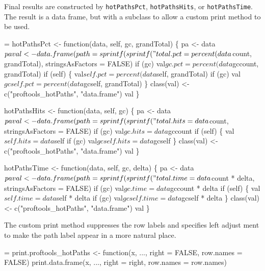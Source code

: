 \documentclass[11pt]{article}
\begin{document}
Final results are constructed by \Verb!hotPathsPct!, \Verb?hotPathsHits?, or
\Verb!hotPathsTime!. The result is a data frame, but with a subclass to
allow a custom print method to be used.
\begin{nwchunk}
=
 hotPathsPct <- function(data, self, gc, grandTotal) \{
     pa <- data$pa
     val <- data.frame(path = sprintf(sprintf("%
                       total.pct = percent(data$count, grandTotal),
                       stringsAsFactors = FALSE)
     if (gc) val$gc.pct = percent(data$gccount, grandTotal)
     if (self) \{
         val$self.pct = percent(data$self, grandTotal)
         if (gc) val$gcself.pct = percent(data$gcself, grandTotal)
     \}
     class(val) <- c("proftools_hotPaths", "data.frame")
     val
 \}
 
 hotPathsHits <- function(data, self, gc) \{
     pa <- data$pa
     val <- data.frame(path = sprintf(sprintf("%
                       total.hits = data$count,
                       stringsAsFactors = FALSE)
     if (gc) val$gc.hits = data$gccount
     if (self) \{
         val$self.hits = data$self
         if (gc) val$gcself.hits = data$gcself
     \}
     class(val) <- c("proftools_hotPaths", "data.frame")
     val
 \}
 
 hotPathsTime <- function(data, self, gc, delta) \{
     pa <- data$pa
     val <- data.frame(path = sprintf(sprintf("%
                       total.time = data$count * delta,
                       stringsAsFactors = FALSE)
     if (gc) val$gc.time = data$gccount * delta
     if (self) \{
         val$self.time = data$self * delta
         if (gc) val$gcself.time = data$gcself * delta
     \}
     class(val) <- c("proftools_hotPaths", "data.frame")
     val
 \}
\end{nwchunk}

The custom print method suppresses the row labels and specifies left
adjust ment to make the path label appear in a more natural place.
\begin{nwchunk}
=
 print.proftools_hotPaths <- function(x, ..., right = FALSE, row.names = FALSE)
     print.data.frame(x, ..., right = right, row.names = row.names)
\end{nwchunk}
\end{document}
